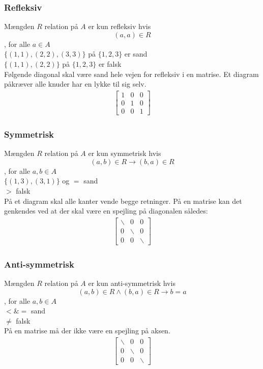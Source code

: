 \documentclass[12pt, a4paper]{article}
\begin{document}
					\subsubsection{Refleksiv}
						Mængden $R$ relation på $A$ er kun refleksiv hvis $$(a,a)\in R$$, for alle $a\in A$\\
						$\{(1,1),(2,2),(3,3)\}$ på $\{1,2,3\}$ er sand\\
						$\{(1,1),(2,2)\}$ på $\{1,2,3\}$ er falsk\\
						Følgende diagonal skal være sand hele vejen for refleksiv i en matrise. Et diagram påkræver alle knuder har en lykke til sig selv.\\
						\begin{align*}
						\begin{bmatrix}
						1 & 0 & 0\\
						0 & 1 & 0\\
						0 & 0 & 1
						\end{bmatrix}				
						\end{align*}
					\subsubsection{Symmetrisk}
						Mængden $R$ relation på $A$ er kun symmetrisk hvis $$(a,b)\in R \rightarrow (b,a)\in R$$, for alle $a,b\in A$\\	
						$\{(1,3),(3,1)\}$ og $=$ sand\\
						$>$ falsk\\
						På et diagram skal alle kanter vende begge retninger. På en matrise kan det genkendes ved at der skal være en spejling på diagonalen således:\\
						\begin{align*}
						\begin{bmatrix}
						\smallsetminus    & 0 & 0\\
						0 & \smallsetminus & 0\\
						0 & 0 & \smallsetminus
						\end{bmatrix}			
						\end{align*}
					\subsubsection{Anti-symmetrisk}
						Mængden $R$ relation på $A$ er kun anti-symmetrisk hvis $$(a,b)\in R\land (b,a)\in R \rightarrow b=a$$, for alle $a,b\in A$\\	
						$< \& =$ sand\\
						$\neq$ falsk\\
						På en matrise må der ikke være en spejling på aksen.
						\begin{align*}
						\begin{bmatrix}
						\smallsetminus    & 0 & 0\\
						0 & \smallsetminus & 0\\
						0 & 0 & \smallsetminus
						\end{bmatrix}			
						\end{align*}
\end{document}
